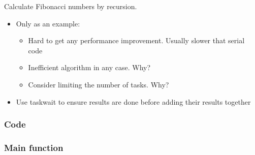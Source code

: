 Calculate Fibonacci numbers by recursion.

\begin{itemize}
\itemsep1pt\parskip0pt
\item
  Only as an example:

  \begin{itemize}
  \itemsep1pt\parskip0pt
  \item
    Hard to get any performance improvement. Usually slower that serial
    code
  \item
    Inefficient algorithm in any case. Why?
  \item
    Consider limiting the number of tasks. Why?
  \end{itemize}
\item
  Use taskwait to ensure results are done before adding their results
  together
\end{itemize}

\subsubsection{Code}\label{code-1}

\begin{Shaded}
\begin{Highlighting}[]


  
\NormalTok{\{}
     \NormalTok{)}
         
     
     
      \NormalTok{;}
    \NormalTok{\{}
        \NormalTok{);}
    \NormalTok{\}}
    \NormalTok{\{}
       \NormalTok{);}
    \NormalTok{\}}
    
     
\NormalTok{\}}
\end{Highlighting}
\end{Shaded}

\subsubsection{Main function}\label{main-function}

